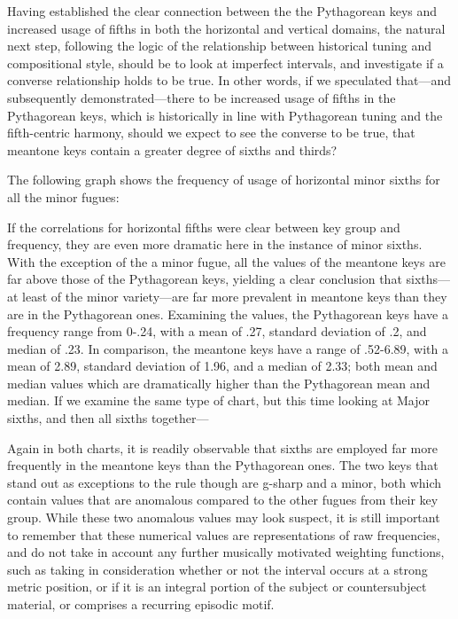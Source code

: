 Having established the clear connection between the the Pythagorean keys
and increased usage of fifths in both the horizontal and vertical
domains, the natural next step, following the logic of the relationship
between historical tuning and compositional style, should be to look at
imperfect intervals, and investigate if a converse relationship holds to
be true. In other words, if we speculated that---and subsequently
demonstrated---there to be increased usage of fifths in the
Pythagorean keys, which is historically in line with Pythagorean tuning
and the fifth-centric harmony, should we expect to see the converse to
be true, that meantone keys contain a greater degree of sixths and
thirds?

The following graph shows the frequency of usage of horizontal minor
sixths for all the minor fugues:



    \begin{center}
    \end{center}
    
    If the correlations for horizontal fifths were clear between key group
and frequency, they are even more dramatic here in the instance of minor
sixths. With the exception of the a minor fugue, all the values of the
meantone keys are far above those of the Pythagorean keys, yielding a
clear conclusion that sixths---at least of the minor
variety---are far more prevalent in meantone keys than they are in
the Pythagorean ones. Examining the values, the Pythagorean keys have a
frequency range from 0-.24, with a mean of .27, standard deviation of
.2, and median of .23. In comparison, the meantone keys have a range of
.52-6.89, with a mean of 2.89, standard deviation of 1.96, and a median
of 2.33; both mean and median values which are dramatically higher than
the Pythagorean mean and median. If we examine the same type of chart,
but this time looking at Major sixths, and then all sixths
together---


    \begin{center}
    \end{center}
    
    Again in both charts, it is readily observable that sixths are employed
far more frequently in the meantone keys than the Pythagorean ones. The
two keys that stand out as exceptions to the rule though are g-sharp and
a minor, both which contain values that are anomalous compared to the
other fugues from their key group. While these two anomalous values may
look suspect, it is still important to remember that these numerical
values are representations of raw frequencies, and do not take in
account any further musically motivated weighting functions, such as
taking in consideration whether or not the interval occurs at a strong
metric position, or if it is an integral portion of the subject or
countersubject material, or comprises a recurring episodic motif.

